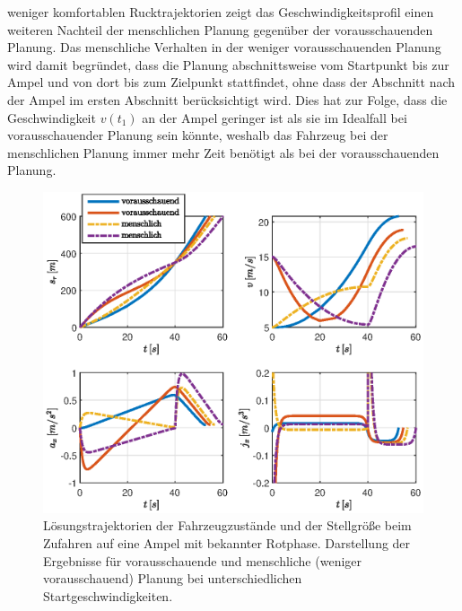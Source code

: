 weniger komfortablen Rucktrajektorien zeigt das Geschwindigkeitsprofil einen weiteren Nachteil der menschlichen Planung gegenüber der vorausschauenden Planung. Das menschliche Verhalten in der weniger vorausschauenden Planung wird damit begründet, dass die Planung abschnittsweise vom Startpunkt bis zur Ampel und von dort bis zum Zielpunkt stattfindet, ohne dass der Abschnitt nach der Ampel im ersten Abschnitt berücksichtigt wird. Dies hat zur Folge, dass die Geschwindigkeit $v(t_1)$ an der Ampel geringer ist als sie im Idealfall bei vorausschauender Planung sein könnte, weshalb das Fahrzeug bei der menschlichen Planung immer mehr Zeit benötigt als bei der vorausschauenden Planung.
\begin{figure}[h] 
	\centering
	\includegraphics[width=\linewidth]{./Bilder/Ergebnisse/Geradeausfahrt/Ampel/v_5_v_15/svaj_zoomj.eps}
	\caption{Lösungstrajektorien der Fahrzeugzustände und der Stellgröße beim Zufahren auf eine Ampel mit bekannter Rotphase. Darstellung der Ergebnisse für vorausschauende und menschliche (weniger vorausschauend) Planung bei unterschiedlichen Startgeschwindigkeiten.}
	\label{fig:svaj_zoomj}
\end{figure} 

